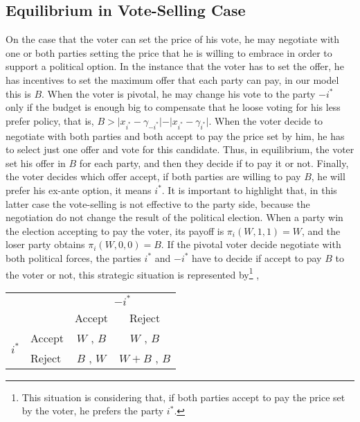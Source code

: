 \documentclass[onesided]{article}\usepackage[]{graphicx}\usepackage[]{color}
\begin{document}
 
 
\subsection{Equilibrium in Vote-Selling Case}

On the case that the voter can set the price of his vote, he may negotiate with one or both parties setting the price that he is willing to embrace in order to support a political option. In the instance that the voter has to set the offer, he has incentives to set the maximum offer that each party can pay, in our model this is $B$. When the voter is pivotal, he may change his vote to the party $-i^*$ only if the budget is enough big to compensate that he loose voting for his less prefer policy, that is, $B> \vert x_{i^*}-\gamma_{-i^*} \vert- \vert x_{i^*}-\gamma_{i^*} \vert$. When the voter decide to negotiate with both parties and both accept to pay the price set by him, he has to select just one offer and vote for this candidate. Thus, in equilibrium, the voter set his offer in $B$ for each party, and then they decide if to pay it or not. Finally, the voter decides which offer accept, if both parties are willing to pay $B$, he will prefer his ex-ante option, it means $i^*$. It is important to highlight that, in this latter case the vote-selling is not effective to the party side, because the negotiation do not change the result of the political election.  When a party win the election accepting to pay the voter, its payoff is $\pi_i(W,1,1)=W$, and the loser party obtains $\pi_i(W,0,0)=B$. If the pivotal voter decide negotiate with both political forces, the parties $i^*$ and $-i^*$ have to decide if accept to pay $B$ to the voter or not, this strategic situation is represented by\footnote{This situation is considering that, if both parties accept to pay the price set by the voter, he prefers the party $i^*$.} ,


\begin{center}

\begin{tabular}{ll|c|c|}
     & \multicolumn{1}{c}{}& \multicolumn{2}{c}{\textbf{$-i^*$}}  \\
     &\multicolumn{1}{c}{} &\multicolumn{1}{c}{Accept} & \multicolumn{1}{c}{Reject} \\
     \cline{3-4}
    \multirow{ 2}{*}{$i^*$} & Accept & $W$ , $B$ & $W$ , $B$ \\
      \cline{3-4}
     & Reject & $B$ , $W$ & $W+B$ , $B$ \\
      \cline{3-4}
\end{tabular}
\end{center}
\end{document}
